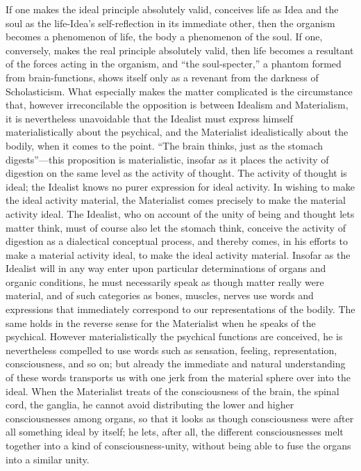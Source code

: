 \documentclass[12pt]{article}
\begin{document}
If one makes the ideal principle absolutely valid, conceives life as Idea
and the soul as the life-Idea's self-reflection in its immediate other, then
the organism becomes a phenomenon of life, the body a phenomenon of the
soul. If one, conversely, makes the real principle absolutely valid, then
life becomes a resultant of the forces acting in the organism, and ``the
soul-specter,'' a phantom formed from brain-functions, shows itself only as a
revenant from the darkness of Scholasticism. What especially makes the
matter complicated is the circumstance that, however irreconcilable the
opposition is between Idealism and Materialism, it is nevertheless
unavoidable that the Idealist must express himself materialistically about
the psychical, and the Materialist idealistically about the bodily, when it
comes to the point. ``The brain thinks, just as the stomach digests''—this
proposition is materialistic, insofar as it places the activity of digestion
on the same level as the activity of thought. The activity of thought is
ideal; the Idealist knows no purer expression for ideal activity. In wishing
to make the ideal activity material, the Materialist comes precisely to make
the material activity ideal. The Idealist, who on account of the unity of
being and thought lets matter think, must of course also let the stomach
think, conceive the activity of digestion as a dialectical conceptual
process, and thereby comes, in his efforts to make
a material activity ideal, to make the ideal activity material. Insofar as
the Idealist will in any way enter upon particular determinations of organs
and organic conditions, he must necessarily speak as though matter really
were material, and of such categories as bones, muscles, nerves use words
and expressions that immediately correspond to our representations of the
bodily. The same holds in the reverse sense for the Materialist when he
speaks of the psychical. However materialistically the psychical functions
are conceived, he is nevertheless compelled to use words such as sensation,
feeling, representation, consciousness, and so on; but already the immediate
and natural understanding of these words transports us with one jerk from
the material sphere over into the ideal. When the Materialist treats of the
consciousness of the brain, the spinal cord, the ganglia, he cannot avoid
distributing the lower and higher consciousnesses among organs, so that it
looks as though consciousness were after all something ideal by itself; he
lets, after all, the different consciousnesses melt together into a kind of
consciousness-unity, without being able to fuse the organs into a similar
unity.
\end{document}
